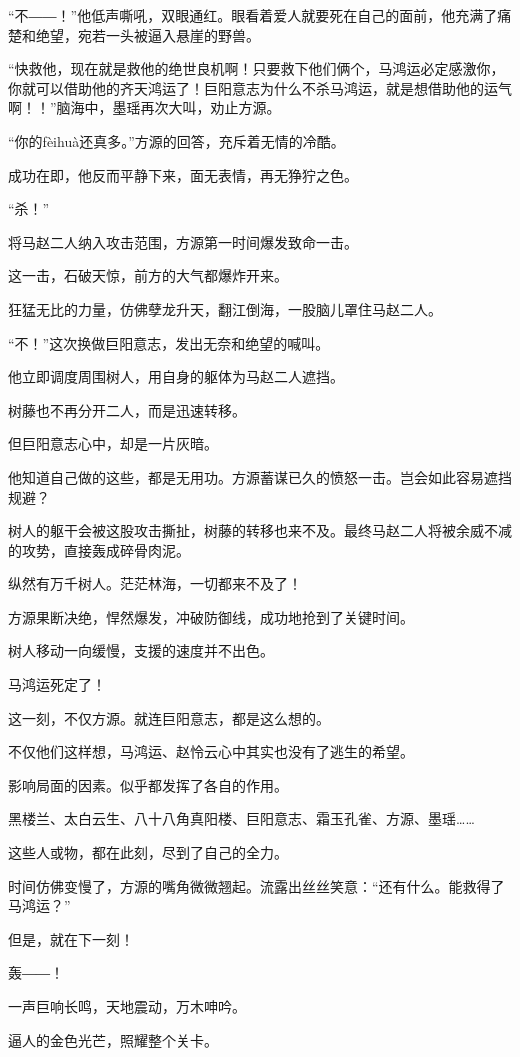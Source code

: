 \begin{this_body}
“不――！”他低声嘶吼，双眼通红。眼看着爱人就要死在自己的面前，他充满了痛楚和绝望，宛若一头被逼入悬崖的野兽。

“快救他，现在就是救他的绝世良机啊！只要救下他们俩个，马鸿运必定感激你，你就可以借助他的齐天鸿运了！巨阳意志为什么不杀马鸿运，就是想借助他的运气啊！！”脑海中，墨瑶再次大叫，劝止方源。

“你的fèihuà还真多。”方源的回答，充斥着无情的冷酷。

成功在即，他反而平静下来，面无表情，再无狰狞之色。

“杀！”

将马赵二人纳入攻击范围，方源第一时间爆发致命一击。

这一击，石破天惊，前方的大气都爆炸开来。

狂猛无比的力量，仿佛孽龙升天，翻江倒海，一股脑儿罩住马赵二人。

“不！”这次换做巨阳意志，发出无奈和绝望的喊叫。

他立即调度周围树人，用自身的躯体为马赵二人遮挡。

树藤也不再分开二人，而是迅速转移。

但巨阳意志心中，却是一片灰暗。

他知道自己做的这些，都是无用功。方源蓄谋已久的愤怒一击。岂会如此容易遮挡规避？

树人的躯干会被这股攻击撕扯，树藤的转移也来不及。最终马赵二人将被余威不减的攻势，直接轰成碎骨肉泥。

纵然有万千树人。茫茫林海，一切都来不及了！

方源果断决绝，悍然爆发，冲破防御线，成功地抢到了关键时间。

树人移动一向缓慢，支援的速度并不出色。

马鸿运死定了！

这一刻，不仅方源。就连巨阳意志，都是这么想的。

不仅他们这样想，马鸿运、赵怜云心中其实也没有了逃生的希望。

影响局面的因素。似乎都发挥了各自的作用。

黑楼兰、太白云生、八十八角真阳楼、巨阳意志、霜玉孔雀、方源、墨瑶……

这些人或物，都在此刻，尽到了自己的全力。

时间仿佛变慢了，方源的嘴角微微翘起。流露出丝丝笑意：“还有什么。能救得了马鸿运？”

但是，就在下一刻！

轰――！

一声巨响长鸣，天地震动，万木呻吟。

逼人的金色光芒，照耀整个关卡。


\end{this_body}
